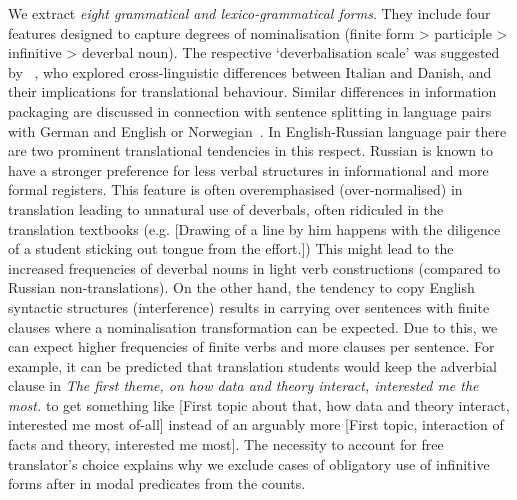 We extract \textit{eight grammatical and lexico-grammatical forms}. They include four features designed to capture degrees of nominalisation (finite form > participle > infinitive > deverbal noun). The respective `deverbalisation scale' was suggested by ~\cite{Korzen2011}, who explored cross-linguistic differences between Italian and Danish, and their implications for translational behaviour. Similar differences in information packaging are discussed in connection with sentence splitting in language pairs with German and English or Norwegian~\cite{FabriciusHansen1999}. 
In English-Russian language pair there are two prominent translational tendencies in this respect. Russian is known to have a stronger preference for less verbal structures in informational and more formal registers. This feature is often overemphasised (over-normalised) in translation leading to unnatural use of deverbals, often ridiculed in the translation textbooks (e.g.  [Drawing of a line by him happens with the diligence of a student sticking out tongue from the effort.]) This might lead to the increased frequencies of deverbal nouns in light verb constructions (compared to Russian non-translations). On the other hand, the tendency to copy English syntactic structures (interference) results in carrying over sentences with finite clauses where a nominalisation transformation can be expected. Due to this, we can expect higher frequencies of finite verbs and more clauses per sentence. For example, it can be predicted that translation students would keep the adverbial clause in \textit{The first theme, on how data and theory interact, interested me the most.} to get something like  [First topic about that, how data and theory interact, interested me most of-all] instead of an arguably more   [First topic, interaction of facts and theory, interested me most].   
The necessity to account for free translator's choice explains why we exclude cases of obligatory use of infinitive forms after in modal predicates from the counts.

